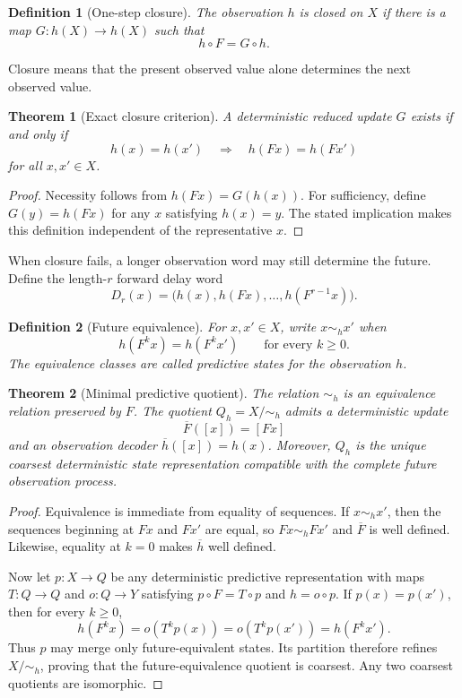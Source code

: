 \documentclass[11pt]{article}
\newtheorem{theorem}{Theorem}
\newtheorem{definition}{Definition}
\begin{document}
\begin{definition}[One-step closure]
The observation $h$ is \emph{closed} on $X$ if there is a map $G:h(X)\to h(X)$
such that
\[
h\circ F=G\circ h.
\]
\end{definition}

Closure means that the present observed value alone determines the next observed
value.

\begin{theorem}[Exact closure criterion]
A deterministic reduced update $G$ exists if and only if
\[
h(x)=h(x')\quad\Longrightarrow\quad h(Fx)=h(Fx')
\]
for all $x,x'\in X$.
\end{theorem}

\begin{proof}
Necessity follows from $h(Fx)=G(h(x))$. For sufficiency, define
$G(y)=h(Fx)$ for any $x$ satisfying $h(x)=y$. The stated implication makes this
definition independent of the representative $x$.
\end{proof}

When closure fails, a longer observation word may still determine the future.
Define the length-$r$ forward delay word
\[
D_r(x)=\bigl(h(x),h(Fx),\ldots,h(F^{r-1}x)\bigr).
\]

\begin{definition}[Future equivalence]
For $x,x'\in X$, write $x\sim_h x'$ when
\[
h(F^k x)=h(F^k x')\qquad\text{for every }k\geq0.
\]
The equivalence classes are called \emph{predictive states} for the observation
$h$.
\end{definition}

\begin{theorem}[Minimal predictive quotient]
The relation $\sim_h$ is an equivalence relation preserved by $F$. The quotient
$Q_h=X/{\sim_h}$ admits a deterministic update
\[
\overline F([x])=[Fx]
\]
and an observation decoder $\overline h([x])=h(x)$. Moreover, $Q_h$ is the unique
coarsest deterministic state representation compatible with the complete future
observation process.
\end{theorem}

\begin{proof}
Equivalence is immediate from equality of sequences. If $x\sim_h x'$, then the
sequences beginning at $Fx$ and $Fx'$ are equal, so $Fx\sim_h Fx'$ and
$\overline F$ is well defined. Likewise, equality at $k=0$ makes $\overline h$
well defined.

Now let $p:X\to Q$ be any deterministic predictive representation with maps
$T:Q\to Q$ and $o:Q\to Y$ satisfying $p\circ F=T\circ p$ and $h=o\circ p$.
If $p(x)=p(x')$, then for every $k\geq0$,
\[
h(F^k x)=o(T^k p(x))=o(T^k p(x'))=h(F^k x').
\]
Thus $p$ may merge only future-equivalent states. Its partition therefore refines
$X/{\sim_h}$, proving that the future-equivalence quotient is coarsest. Any two
coarsest quotients are isomorphic.
\end{proof}
\end{document}
